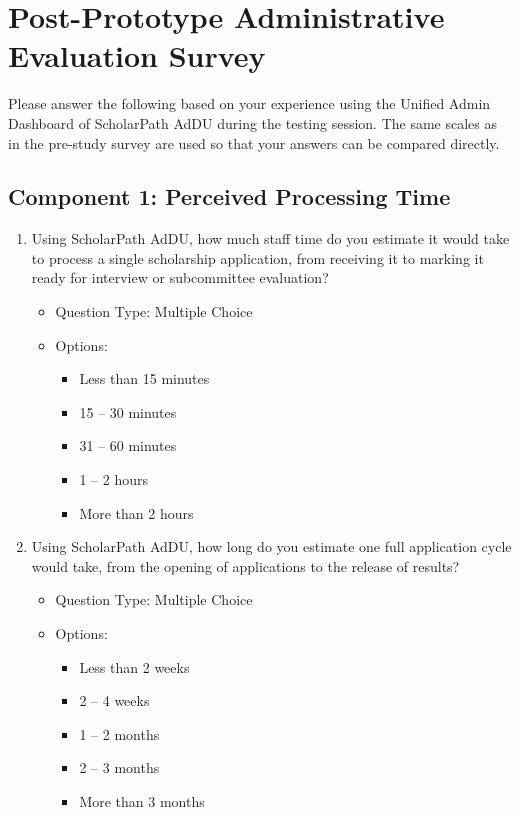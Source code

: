 \chapter{Post-Prototype Administrative Evaluation Survey}
\label{app:post-admin-survey}

Please answer the following based on your experience using the Unified Admin Dashboard of ScholarPath AdDU during the testing session. The same scales as in the pre-study survey are used so that your answers can be compared directly.

\section{Component 1: Perceived Processing Time}

\begin{enumerate}[series=q, label={Question \arabic*:}, leftmargin=*, align=left]
  \item Using ScholarPath AdDU, how much staff time do you estimate it would take to process a single scholarship application, from receiving it to marking it ready for interview or subcommittee evaluation?
  \begin{itemize}[leftmargin=*]
    \item Question Type: Multiple Choice
    \item Options:
    \begin{itemize}[leftmargin=*]
      \item Less than 15 minutes
      \item 15 -- 30 minutes
      \item 31 -- 60 minutes
      \item 1 -- 2 hours
      \item More than 2 hours
    \end{itemize}
  \end{itemize}
  \item Using ScholarPath AdDU, how long do you estimate one full application cycle would take, from the opening of applications to the release of results?
  \begin{itemize}[leftmargin=*]
    \item Question Type: Multiple Choice
    \item Options:
    \begin{itemize}[leftmargin=*]
      \item Less than 2 weeks
      \item 2 -- 4 weeks
      \item 1 -- 2 months
      \item 2 -- 3 months
      \item More than 3 months
    \end{itemize}
  \end{itemize}
\end{enumerate}

